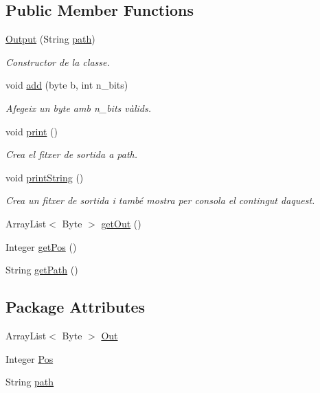 \subsection*{Public Member Functions}
\begin{DoxyCompactItemize}
\item 
\hyperlink{classpersistencia_1_1output_1_1Output_acbb70ea9eabb2a6d0b2d7bd2f3c9009a}{Output} (String \hyperlink{classpersistencia_1_1output_1_1Output_aebef717882f3bcc7080dec014c6714c9}{path})
\begin{DoxyCompactList}\small\item\em Constructor de la classe. \end{DoxyCompactList}\item 
void \hyperlink{classpersistencia_1_1output_1_1Output_adc03a0dd7a94da21fe8432064a4eec09}{add} (byte b, int n\+\_\+bits)
\begin{DoxyCompactList}\small\item\em Afegeix un byte amb n\+\_\+bits vàlids. \end{DoxyCompactList}\item 
void \hyperlink{classpersistencia_1_1output_1_1Output_a416850e57f55bd371d60b2aae8e7e983}{print} ()
\begin{DoxyCompactList}\small\item\em Crea el fitxer de sortida a path. \end{DoxyCompactList}\item 
void \hyperlink{classpersistencia_1_1output_1_1Output_ae6398e0602d281fd044d6557a16eb727}{print\+String} ()
\begin{DoxyCompactList}\small\item\em Crea un fitxer de sortida i també mostra per consola el contingut d\textquotesingle{}aquest. \end{DoxyCompactList}\item 
Array\+List$<$ Byte $>$ \hyperlink{classpersistencia_1_1output_1_1Output_ae4f870c86bed5b445125df989b313b9f}{get\+Out} ()
\item 
Integer \hyperlink{classpersistencia_1_1output_1_1Output_a01f862217e01efb59bc2eff3fe54006f}{get\+Pos} ()
\item 
String \hyperlink{classpersistencia_1_1output_1_1Output_ae33fc52334f791b6d4d7aebf2931df8d}{get\+Path} ()
\end{DoxyCompactItemize}
\subsection*{Package Attributes}
\begin{DoxyCompactItemize}
\item 
Array\+List$<$ Byte $>$ \hyperlink{classpersistencia_1_1output_1_1Output_ab993115d43930b7fb69e5d1c99addfba}{Out}
\item 
Integer \hyperlink{classpersistencia_1_1output_1_1Output_a3709182600423f7e57644ccdd0016f22}{Pos}
\item 
String \hyperlink{classpersistencia_1_1output_1_1Output_aebef717882f3bcc7080dec014c6714c9}{path}
\end{DoxyCompactItemize}


